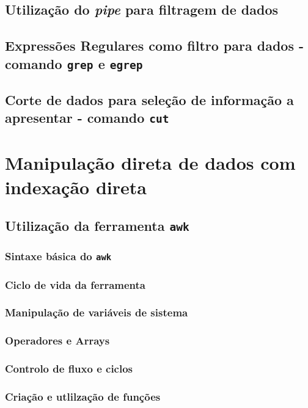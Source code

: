 \documentclass[a4paper, onecolumn, 10pt]{report}
\begin{document}
\subsection{Utilização do \textit{pipe} para filtragem de dados}

\subsection{Expressões Regulares como filtro para dados - comando \texttt{grep} e \texttt{egrep}}

\subsection{Corte de dados para seleção de informação a apresentar - comando \texttt{cut}}

\section{Manipulação direta de dados com indexação direta}

\subsection{Utilização da ferramenta \texttt{awk}}

\subsubsection{Sintaxe básica do \texttt{awk}}

\subsubsection{Ciclo de vida da ferramenta}

\subsubsection{Manipulação de variáveis de sistema}

\subsubsection{Operadores e Arrays}

\subsubsection{Controlo de fluxo e ciclos}

\subsubsection{Criação e utlilzação de funções}
\end{document}
